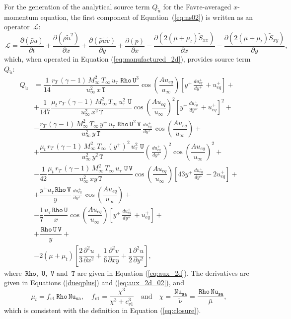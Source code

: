 \documentclass[10pt]{article}
\newcommand{\Diff}[2] {\dfrac{\partial( #1)}{\partial #2}}
\newcommand{\diff}[2] {\dfrac{\partial #1}{\partial #2}}
\newcommand{\Rho}{\,\mathtt{Rho}}
\newcommand{\U}{\,\mathtt{U}}
\newcommand{\V}{\,\mathtt{V}}
\newcommand{\Nu}{\,\mathtt{Nu_{sa}}}
\newcommand{\T}{\,\mathtt{T}}
\newcommand{\Lo}{\,\mathcal{L}}
\newcommand{\Dueqplusyplus}{\, \frac{du_{eq}^+}{dy^+}\,}
\newcommand{\brho}{\bar{\rho}}
\newcommand{\bp}{\bar{p}}
\newcommand{\tu}{\tilde{u}}
\newcommand{\tv}{\tilde{v}}
\newcommand{\tS}{\tilde{S}}
\newcommand{\bmu}{\bar{\mu}}
\begin{document}
For the generation of the analytical source term $Q_{\tu}$ for the Favre-averaged $x$-momentum equation, the first component of Equation~(\ref{eq:ns02}) is written as an  operator $\Lo$:
\begin{equation*}
 \Lo= \Diff{\brho \tu}{t} +\Diff{\brho \tu^2 }{x}+\Diff{\brho \tu\tv}{y} +\Diff{\bp}{x}-\Diff{2(\bmu+\mu_t)\tS_{xx}}{x}-\Diff{2(\bmu+\mu_t)\tS_{xy}}{y},
\end{equation*}
which, when operated in Equation (\ref{eq:manufactured_2d}), provides source term $Q_{\tu}$:
\begin{equation}
 \begin{split}
 Q_{\tu} &=
\dfrac{1}{14}\dfrac{ r_T \,(\gamma-1)\,M_{\infty}^2 \,T_{\infty}\, u_{\tau}\, \Rho \U^3 }{\, u_{\infty}^2 \, x \T}\cos\left(\dfrac{A u_{eq}}{u_{\infty}}\right) \left[y^{+} \Dueqplusyplus+u_{eq}^{+}\right] + \\ 
&+\dfrac{1}{147}\dfrac{\mu_t \, r_T\, (\gamma-1) \,M_{\infty}^2\, T_{\infty}\, u_{\tau}^2 \,\U }{\, u_{\infty}^2 \, x^2 \T}\cos\left(\dfrac{A u_{eq}}{u_{\infty}}\right)^2 \left[y^{+} \Dueqplusyplus+u_{eq}^{+}\right]^2+ \\ 
&-\dfrac{r_T \, (\gamma-1) \, M_{\infty}^2 \, T_{\infty} \,  y^{+} \, u_{\tau} \, \Rho \U^2 \V }{\, u_{\infty}^2 \, y \T} \Dueqplusyplus\cos\left(\dfrac{A u_{eq}}{u_{\infty}}\right)+ \\ 
&+\dfrac{\mu_t\, r_T \,(\gamma-1) \, M_{\infty}^2\, T_{\infty}\, ( y^{+})^2 \, u_{\tau}^2 \,  \U }{\, u_{\infty}^2 \, y^2 \T}\left(\Dueqplusyplus\right)^2\cos\left(\dfrac{A u_{eq}}{u_{\infty}}\right)^2 +\\
&-\dfrac{1}{42}\dfrac{ \mu_t\, r_T\, (\gamma-1) \,M_{\infty}^2 \,T_{\infty} \,u_{\tau} \,\U \V }{\, u_{\infty}^2 \, x y \T}\cos\left(\dfrac{A u_{eq}}{u_{\infty}}\right) \left[43y^{+} \Dueqplusyplus -2u_{eq}^{+}\right]+ \\ 
&+\dfrac{y^{+} u_{\tau}  \Rho \V }{y}\Dueqplusyplus\cos\left(\dfrac{A u_{eq}}{u_{\infty}}\right)+\\
&-\dfrac{1}{7}\dfrac{ u_{\tau} \Rho \U }{x}\cos\left(\dfrac{A u_{eq}}{u_{\infty}}\right) \left[y^{+} \Dueqplusyplus+u_{eq}^{+}\right]+\\
&+\dfrac{\Rho \U \V}{y}+\\
&-2( \mu  + \mu_t) \left[\dfrac{2}{3} \diff{^2u}{x^2}+\dfrac{1}{6} \diff{^2v}{xy}+\dfrac{1}{2} \diff{^2u}{y^2}\right],
 \end{split}
\end{equation}
%
where  $\Rho,\,\U,\,\V$ and $\T$ are given in Equation (\ref{eq:aux_2d}). The derivatives are given in Equations (\ref{dueqplus}) and (\ref{eq:aux_2d_02}), and
\begin{equation}\label{eq:mu_t}
  \mu_t= f_{v1} \Rho \Nu,\quad f_{v1} = \dfrac{\chi^3}{\chi^3+c_{v1}^3}\quad \mbox{and}\quad \chi =\dfrac{\Nu}{\tilde{\nu}} =\dfrac{\Rho \Nu}{\bmu},
\end{equation}
which is consistent with the definition in Equation (\ref{eq:closure}).
\end{document}

